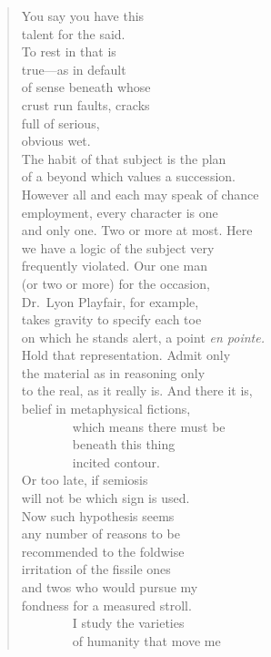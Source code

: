 \documentclass[
]{memoir}
\begin{document}
\begin{verse}
You say you have this\\
talent for the said.\\
To rest in that is\\
true—as in default\\
of sense beneath whose\\
crust run faults, cracks\\
full of serious,\\
obvious wet.\\
The habit of that subject is the plan\\
of a beyond which values a succession.\\
However all and each may speak of chance\\
employment, every character is one\\
and only one. Two or more at most. Here\\
we have a logic of the subject very\\
frequently violated. Our one man\\
(or two or more) for the occasion,\\
Dr. Lyon Playfair, for example,\\
takes gravity to specify each toe\\
on which he stands alert, a point \emph{en pointe.}\\
Hold that representation. Admit only\\
the material as in reasoning only\\
to the real, as it really is. And there it is,\\
belief in metaphysical fictions,\\
        which  means there must be\\
        beneath this thing\\
        incited contour.\\
Or too late, if semiosis\\
will not be which sign is used.\\
Now such hypothesis seems\\
any number of reasons to be\\
recommended to the foldwise\\
irritation of the fissile ones\\
and twos who would pursue my\\
fondness for a measured stroll.\\
        I study the varieties\\
        of humanity that move me\\

\end{verse}
\end{document}
